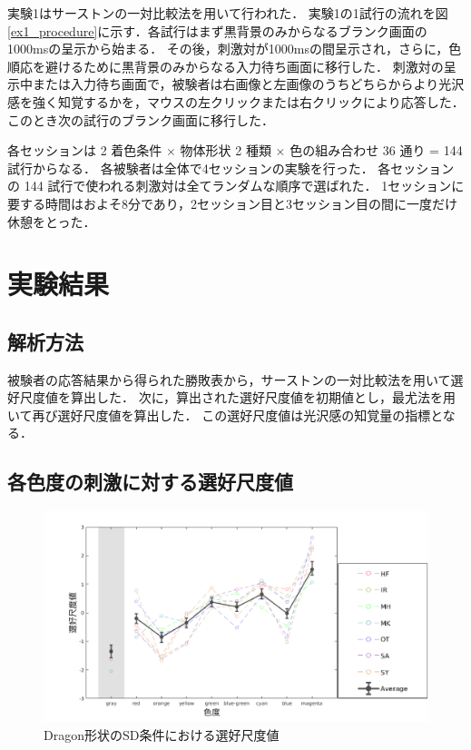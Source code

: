             実験1はサーストンの一対比較法を用いて行われた．
            実験1の1試行の流れを図\ref{ex1_procedure}に示す．各試行はまず黒背景のみからなるブランク画面の1000msの呈示から始まる．
            その後，刺激対が1000msの間呈示され，さらに，色順応を避けるために黒背景のみからなる入力待ち画面に移行した．
            刺激対の呈示中または入力待ち画面で，被験者は右画像と左画像のうちどちらからより光沢感を強く知覚するかを，マウスの左クリックまたは右クリックにより応答した．
            このとき次の試行のブランク画面に移行した．

            各セッションは 2 着色条件 $\times$ 物体形状 2 種類 $\times$ 色の組み合わせ 36 通り = 144 試行からなる．
            各被験者は全体で4セッションの実験を行った．
            各セッションの 144 試行で使われる刺激対は全てランダムな順序で選ばれた．
            1セッションに要する時間はおよそ8分であり，2セッション目と3セッション目の間に一度だけ休憩をとった．



    \section{実験結果}
        \subsection{解析方法}
            被験者の応答結果から得られた勝敗表から，サーストンの一対比較法を用いて選好尺度値を算出した．
            次に，算出された選好尺度値を初期値とし，最尤法を用いて再び選好尺度値を算出した．
            この選好尺度値は光沢感の知覚量の指標となる．
            

        \newpage
        \subsection{各色度の刺激に対する選好尺度値}
            
            \begin{figure}[h]
                \centering
                \includegraphics[width=15.0cm]{./img/ex1_res_DSD_p.png}
                \caption{Dragon形状のSD条件における選好尺度値}
                \label{ex1_DSD}
            \end{figure}

